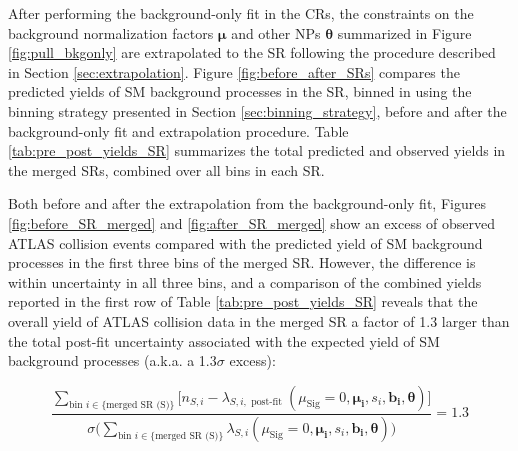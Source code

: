 After performing the background-only fit in the CRs, the constraints on the background normalization factors \(\boldsymbol{\mu}\) and other NPs \(\boldsymbol{\theta}\) summarized in Figure \ref{fig:pull_bkgonly} are extrapolated to the SR following the procedure described in Section \ref{sec:extrapolation}. Figure \ref{fig:before_after_SRs} compares the predicted yields of SM background processes in the SR, binned in \minms using the binning strategy presented in Section \ref{sec:binning_strategy}, before and after the background-only fit and extrapolation procedure. Table \ref{tab:pre_post_yields_SR} summarizes the total predicted and observed yields in the merged SRs, combined over all bins in each SR.

Both before and after the extrapolation from the background-only fit, Figures \ref{fig:before_SR_merged} and \ref{fig:after_SR_merged} show an excess of observed ATLAS collision events compared with the predicted yield of SM background processes in the first three bins of the merged SR. However, the difference is within uncertainty in all three bins, and a comparison of the combined yields reported in the first row of Table \ref{tab:pre_post_yields_SR} reveals that the overall yield of ATLAS collision data in the merged SR a factor of 1.3 larger than the total post-fit uncertainty associated with the expected yield of SM background processes (a.k.a. a 1.3\(\sigma\) excess):

\begin{equation}
\label{eq:merged_sigma}
\frac{ \sum_{\text{bin }i\in\{\text{merged SR (S)}\}}\big[n_{S,i} - \lambda_{S,i, \text{ post-fit }}(\mu_\text{Sig}=0, \boldsymbol{\mu_i}, s_i, \boldsymbol{b_i}, \boldsymbol{\theta})\big] }{\sigma\Big(\sum_{\text{bin }i\in\{\text{merged SR (S)}\}} \lambda_{S,i}(\mu_\text{Sig}=0, \boldsymbol{\mu_i}, s_i, \boldsymbol{b_i}, \boldsymbol{\theta}) \Big)} = 1.3
\end{equation}

